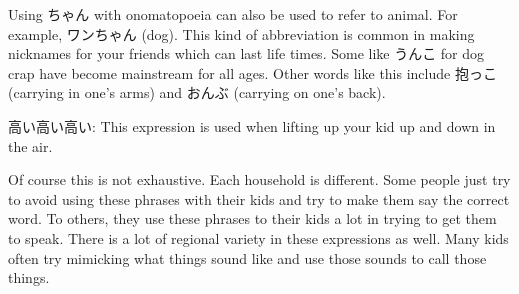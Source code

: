\par{ Using ちゃん with onomatopoeia can also be used to refer to animal. For example, ワンちゃん (dog). This kind of abbreviation is common in making nicknames for your friends which can last life times. Some like うんこ for dog crap have become mainstream for all ages. Other words like this include 抱っこ (carrying in one's arms) and おんぶ (carrying on one's back). }

\par{高い高い高い: This expression is used when lifting up your kid up and down in the air. }

\par{ Of course this is not exhaustive. Each household is different. Some people just try to avoid using these phrases with their kids and try to make them say the correct word. To others, they use these phrases to their kids a lot in trying to get them to speak. There is a lot of regional variety in these expressions as well. Many kids often try mimicking what things sound like and use those sounds to call those things. }
    